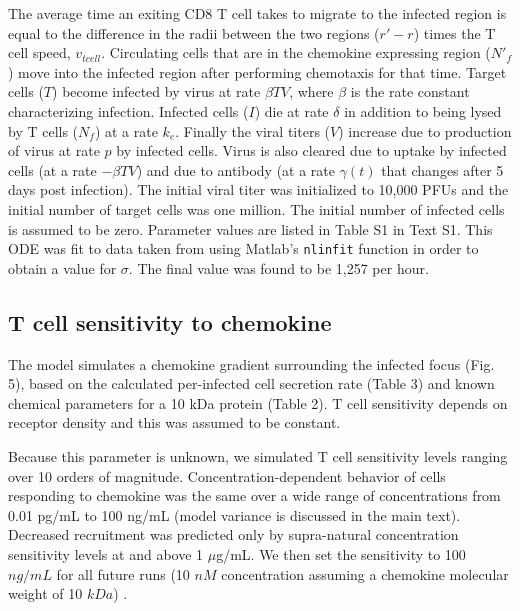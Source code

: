 \documentclass[10pt]{article}
\begin{document}
The average time an exiting CD8 T cell takes to migrate to the infected region is equal to the difference in the radii between the two regions ($r' - r$) times the T cell speed, $v_{tcell}$.  Circulating cells that are in the chemokine expressing region ($N'_{f}$) move into the infected region after performing chemotaxis for that time. Target cells ($T$) become infected by virus at rate $\beta TV$, where $\beta$ is the rate constant characterizing infection. Infected cells ($I$) die at rate $\delta$ in addition to being lysed by T cells ($N_{f}$) at a rate $k_{e}$. Finally the viral titers ($V$) increase due to production of virus at rate $p$ by infected cells. Virus is also cleared due to uptake by infected cells (at a rate $- \beta TV$) and due to antibody (at a rate $\gamma (t)$ that changes after 5 days post infection). The initial viral titer was initialized to 10,000 PFUs and the initial number of target cells was one million. The initial number of infected cells is assumed to be zero. Parameter values are listed in Table S1 in Text S1.  This ODE was fit to data taken from \cite{Miao2010} using Matlab's \texttt{nlinfit} function in order to obtain a value for $\sigma$.  The final value was found to be 1,257 per hour.

\subsection{T cell sensitivity to chemokine}

The model simulates a chemokine gradient surrounding the infected focus (Fig. 5), based on the calculated per-infected cell secretion rate (Table 3) and known chemical parameters for a 10 kDa protein (Table 2).  T cell sensitivity depends on receptor density \cite{Desmetz2006} and this was assumed to be constant.

Because this parameter is unknown, we simulated T cell sensitivity levels ranging over 10 orders of magnitude.  Concentration-dependent behavior of cells responding to chemokine was the same over a wide range of concentrations from 0.01 pg/mL to 100 ng/mL (model variance is discussed in the main text).  Decreased recruitment was predicted only by supra-natural concentration sensitivity levels at and above 1 $\mu$g/mL.  We then set the sensitivity to 100 $ng/mL$ for all future runs (10 $nM$ concentration assuming a chemokine molecular weight of 10 $kDa$) \cite{Gao2003}.  

\end{document}

